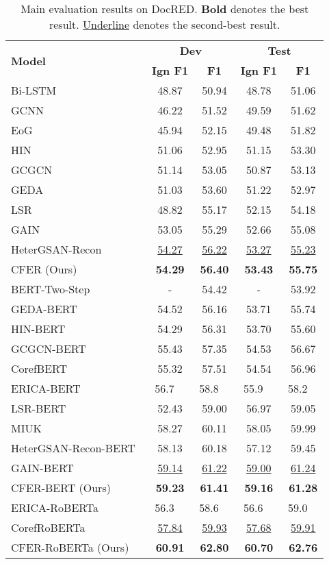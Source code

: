 \documentclass{article}
\newcommand{\citep}{\cite}
\begin{document}
\begin{table*}[t]
\centering
\setlength{\tabcolsep}{15pt}
\begin{tabular}{l | c c | c c}
\toprule
\multirow{2}{*}{\textbf{Model}} & \multicolumn{2}{c|}{\textbf{Dev}} & \multicolumn{2}{c}{\textbf{Test}} \\ 
& \textbf{Ign F1} & \textbf{F1} & \textbf{Ign F1} & \textbf{F1}  \\ 
\midrule
\midrule
Bi-LSTM~\citep{docred} & 48.87 & 50.94 & 48.78 & 51.06 \\
GCNN~\citep{gcnn} & 46.22 & 51.52 & 49.59 & 51.62 \\
EoG~\citep{eog} & 45.94 & 52.15 & 49.48 & 51.82 \\
HIN~\citep{hin} & 51.06 & 52.95 & 51.15 & 53.30 \\
GCGCN~\citep{gcgcn} & 51.14 & 53.05 & 50.87 & 53.13 \\
GEDA~\citep{geda} & 51.03 & 53.60 & 51.22 & 52.97 \\
LSR~\citep{lsr} & 48.82 & 55.17 & 52.15 & 54.18 \\
GAIN~\citep{gain} & 53.05 & 55.29 & 52.66 & 55.08 \\
HeterGSAN-Recon~\citep{recon} & \underline{54.27} & \underline{56.22} & \underline{53.27} & \underline{55.23} \\
CFER (Ours) & \textbf{54.29} & \textbf{56.40} & \textbf{53.43} & \textbf{55.75} \\
\midrule
BERT-Two-Step~\citep{bert_two_step} & - & 54.42 & - & 53.92 \\
GEDA-BERT~\citep{geda} & 54.52 & 56.16 & 53.71 & 55.74 \\
HIN-BERT~\citep{hin} & 54.29 & 56.31 & 53.70 & 55.60 \\
GCGCN-BERT~\citep{gcgcn} & 55.43 & 57.35 & 54.53 & 56.67 \\
CorefBERT~\citep{coref_bert} & 55.32 & 57.51 & 54.54 & 56.96 \\
ERICA-BERT~\citep{erica} & 56.7~~ & 58.8~~ & 55.9~~ & 58.2~~ \\
LSR-BERT~\citep{lsr} & 52.43 & 59.00 & 56.97 & 59.05 \\
MIUK~\citep{miuk} & 58.27 & 60.11 & 58.05 & 59.99 \\
HeterGSAN-Recon-BERT~\citep{recon} & 58.13 & 60.18 & 57.12 & 59.45 \\
GAIN-BERT~\citep{gain} & \underline{59.14} & \underline{61.22} & \underline{59.00} & \underline{61.24} \\
CFER-BERT (Ours) & \textbf{59.23} & \textbf{61.41} & \textbf{59.16} & \textbf{61.28} \\
\midrule
ERICA-RoBERTa~\citep{erica} & 56.3~~ & 58.6~~ & 56.6~~ & 59.0~~ \\
CorefRoBERTa~\citep{coref_bert} & \underline{57.84} & \underline{59.93} & \underline{57.68} & \underline{59.91} \\
CFER-RoBERTa (Ours) & \textbf{60.91} & \textbf{62.80} & \textbf{60.70} & \textbf{62.76} \\
\bottomrule
\end{tabular}
\caption{Main evaluation results on DocRED. \textbf{Bold} denotes the best result. \underline{Underline} denotes the second-best result. }
\label{tab:docred_rlt}
\end{table*}
\end{document}
